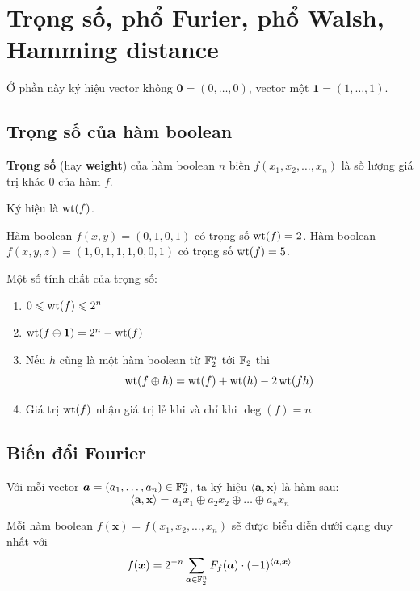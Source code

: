 \section{Trọng số, phổ Furier, phổ Walsh, Hamming distance}

Ở phần này ký hiệu vector không $\bm{0} = (0, \ldots, 0)$, vector một $\bm{1} = (1, \ldots, 1)$.

\subsection*{Trọng số của hàm boolean}

\begin{definition}
	\textbf{Trọng số} (hay \textbf{weight}) của hàm boolean $n$ biến $f(x_1, x_2, \ldots, x_n)$ là số lượng giá trị khác 0 của hàm $f$. 
    
    Ký hiệu là $\operatorname{wt}(f)$.
\end{definition}

\begin{example}
	Hàm boolean $f(x, y) = (0, 1, 0, 1)$ có trọng số $\operatorname{wt}(f) = 2$.
	Hàm boolean $f(x, y, z) = (1, 0, 1, 1, 1, 0, 0, 1)$ có trọng số $\operatorname{wt}(f) = 5$.
\end{example}

Một số tính chất của trọng số:

\begin{enumerate}
	\item $0 \leqslant \operatorname{wt}(f) \leqslant 2^n$
	\item $\operatorname{wt}(f \oplus \bm{1}) = 2^n - \operatorname{wt}(f)$
	\item Nếu $h$ cũng là một hàm boolean từ $\mathbb{F}_2^n$ tới $\mathbb{F}_2$ thì \[\operatorname{wt}(f \oplus h) = \operatorname{wt}(f) + \operatorname{wt}(h) - 2 \operatorname{wt}(fh)\]
	\item Giá trị $\operatorname{wt}(f)$ nhận giá trị lẻ khi và chỉ khi $\deg(f) = n$
\end{enumerate}

\subsection*{Biến đổi Fourier}

Với mỗi vector $\bm{a} = (a_1, \ldots, a_n) \in \mathbb{F}_2^n$, ta ký
hiệu $\langle \bm{a}, \bm{x} \rangle$ là hàm sau:
\begin{equation}\label{fur:eq1}
	\langle \bm{a}, \bm{x} \rangle = a_1 x_1 \oplus a_2 x_2 \oplus \ldots \oplus a_n x_n
\end{equation}

Mỗi hàm boolean $f(\bm{x}) = f(x_1, x_2, \ldots, x_n)$ sẽ được biểu diễn dưới dạng duy nhất với
\begin{equation}\label{fur:eq2}
	f(\bm{x}) = 2^{-n} \sum_{\bm{a} \in \mathbb{F}_2^n} F_f (\bm{a}) \cdot (-1)^{\langle \bm{a}, \bm{x} \rangle}
\end{equation}

